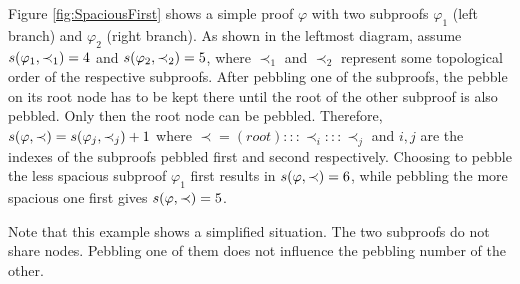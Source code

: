 \begin{example}
Figure \ref{fig:SpaciousFirst} shows a simple proof $\varphi$ with two subproofs $\varphi_1$ (left branch) and $\varphi_2$ (right branch). 
As shown in the leftmost diagram, assume $s(\varphi_1,\prec_1) = 4$ and $s(\varphi_2,\prec_2) = 5$, where $\prec_1$ and $\prec_2$ represent some topological order of the respective subproofs.
After pebbling one of the subproofs, the pebble on its root node has to be kept there until the root of the other subproof is also pebbled. 
Only then the root node can be pebbled. 
Therefore, $s(\varphi,\prec) = s(\varphi_j,\prec_j) + 1$ where $\prec = (root) ::: \prec_i ::: \prec_j$ and $i, j$ are the indexes of the subproofs pebbled first and second respectively. 
Choosing to pebble the less spacious subproof $\varphi_1$ first results in $s(\varphi,\prec) = 6$, while pebbling the more spacious one first gives $s(\varphi,\prec) = 5$.

Note that this example shows a simplified situation. 
The two subproofs do not share nodes. 
Pebbling one of them does not influence the pebbling number of the other.


\end{example}
